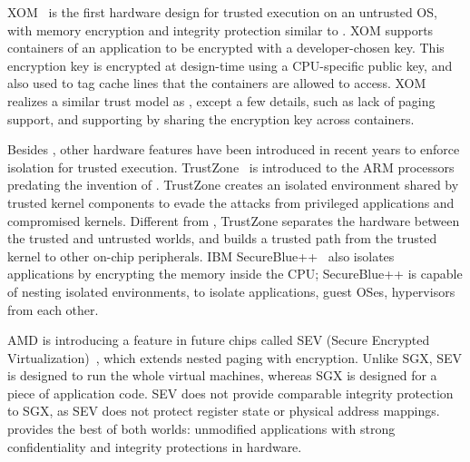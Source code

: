 XOM~\cite{lie2003implementing} is the first hardware design for trusted execution on an untrusted OS,
with memory encryption and integrity protection similar to \sgx{}. XOM supports containers of an application to be encrypted with a developer-chosen key. This encryption key is encrypted at design-time using a CPU-specific public key, and also used to tag cache lines that the containers are allowed to access.
XOM realizes a similar trust model as \sgx{}, except a few details, such as lack of paging support, and supporting  by sharing the encryption key across containers.

Besides \sgx{}, other hardware features have been introduced in recent years to enforce isolation for trusted execution.
TrustZone~\cite{arm-trustzone} is introduced to the ARM processors predating the invention of \sgx{}.
TrustZone creates an isolated environment shared by trusted kernel components to evade the attacks from privileged applications and compromised kernels.
Different from \sgx{}, TrustZone separates the hardware between the trusted and untrusted worlds,
and builds a trusted path from the trusted kernel to other on-chip peripherals.
IBM SecureBlue++~\cite{secureblue++} also isolates applications by encrypting the memory inside the CPU; SecureBlue++ is capable of nesting isolated environments, to isolate applications, guest OSes, hypervisors from each other.



AMD is introducing a feature in future chips called SEV (Secure Encrypted Virtualization)~\cite{amd-sme},
which extends nested paging with encryption.
Unlike SGX, SEV is designed to run the whole virtual machines, whereas SGX is designed for 
a piece of application code.
SEV does not provide comparable integrity protection to SGX, as SEV does not protect register state or
physical address mappings.
\graphenesgx{} provides the best of both worlds: unmodified applications with strong confidentiality and integrity protections in hardware.




